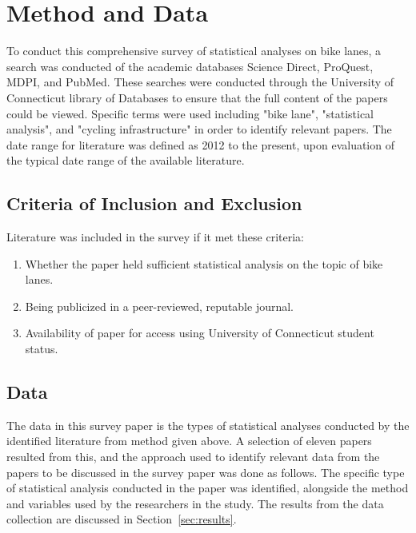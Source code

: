 \documentclass[12pt, letterpaper]{article}
\begin{document}
\section{Method and Data}
\label{sec:methodanddata}

To conduct this comprehensive survey of statistical analyses on bike lanes, a search was conducted of the academic databases Science Direct, ProQuest, MDPI, and PubMed. These searches were conducted through the University of Connecticut library of Databases to ensure that the full content of the papers could be viewed. Specific terms were used including "bike lane", "statistical analysis", and "cycling infrastructure" in order to identify relevant papers. The date range for literature was defined as 2012 to the present, upon evaluation of the typical date range of the available literature. \par

\subsection{Criteria of Inclusion and Exclusion}
\label{sec:inc}

Literature was included in the survey if it met these criteria:

\begin{enumerate}
        \item Whether the paper held sufficient statistical analysis on the topic of bike lanes. 
        \item Being publicized in a peer-reviewed, reputable journal.
        \item Availability of paper for access using University of Connecticut student status. 
\end{enumerate}

\subsection{Data}
\label{sec:data}

The data in this survey paper is the types of statistical analyses conducted by the identified literature from method given above. A selection of eleven papers resulted from this, and the approach used to identify relevant data from the papers to be discussed in the survey paper was done as follows. The specific type of statistical analysis conducted in the paper was identified, alongside the method and variables used by the researchers in the study. The results from the data collection are discussed in Section~\ref{sec:results}. 
\end{document}
